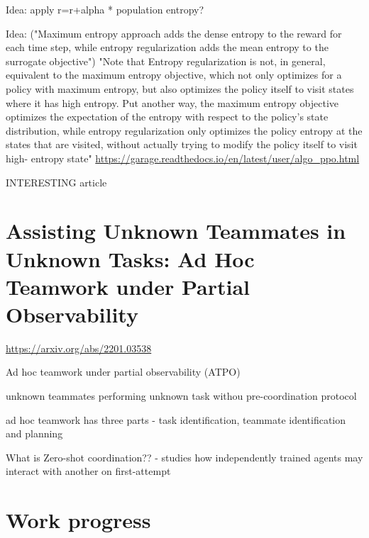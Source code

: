 \documentclass{report}
\begin{document}
\begin{list}{}{}
    \item Idea: apply r=r+alpha * population entropy?
    \item Idea: ("Maximum entropy approach adds the dense entropy to the reward for each time step, while entropy regularization adds the mean entropy to the surrogate objective") 
        "Note that
        Entropy regularization is not, in general, equivalent to the maximum entropy objective, which not only optimizes for
        a policy with maximum entropy, but also optimizes the policy itself to visit states where it has high
        entropy. Put another way, the maximum entropy objective optimizes the expectation of the entropy
        with respect to the policy’s state distribution, while entropy regularization only optimizes the policy
        entropy at the states that are visited, without actually trying to modify the policy itself to visit high-
        entropy state"
        \url{https://garage.readthedocs.io/en/latest/user/algo_ppo.html}
    \item 
    \item INTERESTING article
\end{list}

\section{Assisting Unknown Teammates in Unknown Tasks: Ad Hoc Teamwork under Partial Observability}
\url{https://arxiv.org/abs/2201.03538}
\begin{list}{}{}
    \item Ad hoc teamwork under partial observability (ATPO)
    \item unknown teammates performing unknown task withou pre-coordination protocol
    \item ad hoc teamwork has three parts - task identification, teammate identification and planning
    \item 
\end{list}


What is Zero-shot coordination?? - studies how independently trained agents may interact with another on first-attempt
\section{}
\url{}
\begin{list}{}{}
    \item
\end{list}


\section{Work progress}
\end{document}
